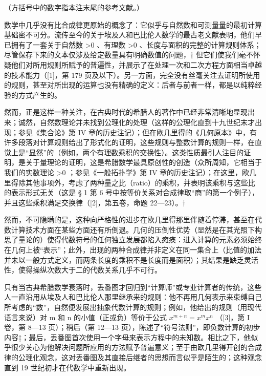 
（方括号中的数字指本注末尾的参考文献。）

数学中几乎没有比合成律更原始的概念了：它似乎与自然数和可测量量的最初计算基础密不可分。流传至今的关于埃及人和巴比伦人数学的最古老文献表明，他们早已拥有了一套关于自然数 \textgreater0 、有理数 \textgreater0 、长度与面积的完整的计算规则体系；尽管保存下来的文本仅涉及给定数量具有明确数值的问题，† 但它们使我们毫不怀疑他们对所用规则所赋予的普遍性，并展示了在处理一次和二次方程方面相当卓越的技术能力（{[}1{]}，第 179 页及以下）。另一方面，完全没有丝毫关注去证明所使用的规则，甚至对所出现的运算也没有精确的定义：后者与前者一样，都是以纯粹经验的方式产生的。

然而，正是这样一种关注，在古典时代的希腊人的著作中已经非常清晰地显现出来；诚然，自然数理论并未找到公理化的处理（这样的公理化直到十九世纪末才出现；参见《集合论》第 IV 章的历史注记）；但在欧几里得的《几何原本》中，有许多段落对计算规则给出了形式化的证明，这些规则与整数计算的规则一样，在直觉上是“显然”的（例如，两个有理数乘积的交换性）。这类性质最引人注目的证明，是关于量理论的证明，这是希腊数学最具原创性的创造（众所周知，它相当于我们的实数理论 \textgreater0 ；参见《一般拓扑学》第 IV 章的历史注记）；在这里，欧几里得除其他事项外，考虑了两种量之比（ratio）的乘积，并表明该乘积与这些比的表示形式无关（这是 § 1 第 6 号中按等价关系对合成律取“商”的第一个例子），并且这些乘积满足交换律（{[}2{]}，第五卷，命题 22—23）。†

然而，不可隐瞒的是，这种向严格性的进步在欧几里得那里伴随着停滞，甚至在代数计算技术方面在某些方面还有所倒退。几何的压倒性优势（显然是在其光照下构思了量论的）使得代数符号的任何独立发展都陷入瘫痪：进入计算的元素必须始终在几何上被“表示”；此外，出现的两种合成律并非定义在同一集合上（比值的加法并未以一般方式定义，而两条长度的乘积不是长度而是面积）；其结果是缺乏灵活性，使得操纵次数大于二的代数关系几乎不可行。

只有当古典希腊数学衰落时，丢番图才回归到“计算师”或专业计算者的传统，这些人一直沿用从埃及人和巴比伦人那里继承来的规则：他不再用几何表示来束缚自己所考虑的“数”，自然便发展出抽象代数计算的规则；例如，他给出的规则（用现代语言来说）对 m 和 n 的小值（正或负）等价于公式 \(x^{m+n} = x^{m}x^{n}\) （{[}3{]}，第 I 卷，第 8—13 页）；稍后（第 12—13 页），陈述了“符号法则”，即负数计算的初步内容‡；最后，丢番图首次使用一个字母来表示方程中的未知数。相比之下，他似乎很少关心为他解决问题所应用的方法赋予普遍意义；至于由欧几里得开创的合成律的公理化观念，这对丢番图及其直接后继者的思想而言似乎是陌生的；这种观念直到 19 世纪初才在代数学中重新出现。

